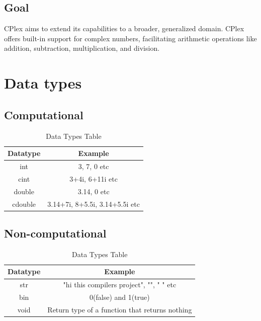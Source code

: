 \documentclass[12pt]{article}
\begin{document}
\subsection{Goal}
CPlex aims to extend its capabilities to a broader, generalized domain. CPlex offers built-in support for complex numbers, facilitating arithmetic operations like addition, subtraction, multiplication, and division. 
\section{Data types}

\subsection{Computational}
\begin{table}[ht]
\centering
\renewcommand{\arraystretch}{1.5} %
\setlength{\tabcolsep}{30pt} %
\begin{tabular}{|c|c|}
\hline
\bfseries Datatype & \bfseries Example \\
\hline
int &  3, 7, 0 etc\\
\hline
cint &  3+4i, 6+11i etc\\
\hline
double &  3.14, 0 etc \\
\hline
cdouble &   3.14+7i, 8+5.5i, 3.14+5.5i etc\\

\hline
\end{tabular}
\caption{Data Types Table}
\end{table}
\subsection{Non-computational}

\begin{table}[ht]
\centering
\renewcommand{\arraystretch}{1.5} %
\setlength{\tabcolsep}{30pt} %
\begin{tabular}{|c|c|}
\hline
\bfseries Datatype & \bfseries Example \\
\hline

\hline
str &  "hi this compilers project", "", " " etc\\
\hline
bin &  0(false) and 1(true)\\
\hline
void &  Return type of a function that returns nothing\\
\hline
\end{tabular}
\caption{Data Types Table}
\end{table}
\end{document}
